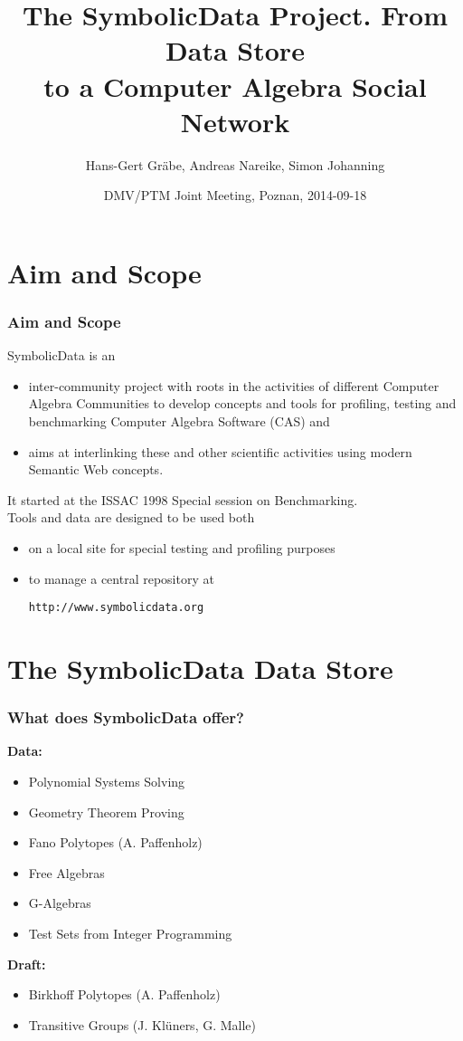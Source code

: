 \documentclass{beamer}
\title[The SymbolicData Project]{The SymbolicData Project. From Data
  Store\\ to a Computer Algebra Social Network}
\author[Gr\"abe, Nareike, Johanning]{Hans-Gert Gr\"abe, Andreas Nareike, Simon
  Johanning}
\institute[]{Leipzig University, Germany\\
\texttt{http://bis.informatik.uni-leipzig.de/HansGertGraebe}}
\date{DMV/PTM Joint Meeting, Poznan, 2014-09-18}
\begin{document}
\begin{frame}
\titlepage
\end{frame}

\section{Aim and Scope}
\begin{frame}\frametitle{Aim and Scope}\small
{\normalsize SymbolicData is an}
\begin{itemize}
\item inter-community project with roots in the activities of different
  Computer Algebra Communities to develop concepts and tools for profiling,
  testing and benchmarking Computer Algebra Software (CAS) and
\item aims at interlinking these and other scientific activities using modern
  Semantic Web concepts.
\end{itemize}
{\normalsize 
It started at the ISSAC 1998 Special session on Benchmarking.\\[.6em]
Tools and data are designed to be used both}
\begin{itemize}
\item on a local site for special testing and profiling purposes
\item to manage a central repository at 
  \begin{center}\normalsize 
    \texttt{http://www.symbolicdata.org}
  \end{center}
\end{itemize}
\end{frame}

\section{The SymbolicData Data Store}
\begin{frame}\frametitle{What does SymbolicData offer?}
\textbf{Data:}
\begin{itemize}
\item Polynomial Systems Solving
\item Geometry Theorem Proving
\item Fano Polytopes (A. Paffenholz)
\item Free Algebras
\item G-Algebras
\item Test Sets from Integer Programming
\end{itemize}
\textbf{Draft:}
\begin{itemize}
\item Birkhoff Polytopes (A. Paffenholz)
\item Transitive Groups (J. Kl\"uners, G. Malle)
\end{itemize}
\end{frame}
\end{document}
